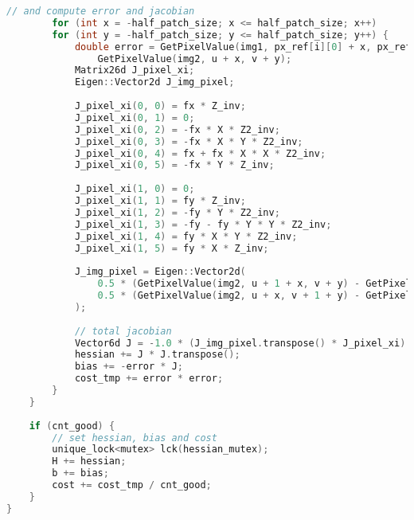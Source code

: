 \begin{lstlisting}[language=c++,caption=slambook2/ch8/direct_method.cpp（片段）]
		// and compute error and jacobian
		for (int x = -half_patch_size; x <= half_patch_size; x++)
		for (int y = -half_patch_size; y <= half_patch_size; y++) {
			double error = GetPixelValue(img1, px_ref[i][0] + x, px_ref[i][1] + y) -
				GetPixelValue(img2, u + x, v + y);
			Matrix26d J_pixel_xi;
			Eigen::Vector2d J_img_pixel;
			
			J_pixel_xi(0, 0) = fx * Z_inv;
			J_pixel_xi(0, 1) = 0;
			J_pixel_xi(0, 2) = -fx * X * Z2_inv;
			J_pixel_xi(0, 3) = -fx * X * Y * Z2_inv;
			J_pixel_xi(0, 4) = fx + fx * X * X * Z2_inv;
			J_pixel_xi(0, 5) = -fx * Y * Z_inv;
			
			J_pixel_xi(1, 0) = 0;
			J_pixel_xi(1, 1) = fy * Z_inv;
			J_pixel_xi(1, 2) = -fy * Y * Z2_inv;
			J_pixel_xi(1, 3) = -fy - fy * Y * Y * Z2_inv;
			J_pixel_xi(1, 4) = fy * X * Y * Z2_inv;
			J_pixel_xi(1, 5) = fy * X * Z_inv;
			
			J_img_pixel = Eigen::Vector2d(
				0.5 * (GetPixelValue(img2, u + 1 + x, v + y) - GetPixelValue(img2, u - 1 + x, v + y)),
				0.5 * (GetPixelValue(img2, u + x, v + 1 + y) - GetPixelValue(img2, u + x, v - 1 + y))
			);
			
			// total jacobian
			Vector6d J = -1.0 * (J_img_pixel.transpose() * J_pixel_xi).transpose();
			hessian += J * J.transpose();
			bias += -error * J;
			cost_tmp += error * error;
		}
	}
	
	if (cnt_good) {
		// set hessian, bias and cost
		unique_lock<mutex> lck(hessian_mutex);
		H += hessian;
		b += bias;
		cost += cost_tmp / cnt_good;
	}
}
\end{lstlisting}

